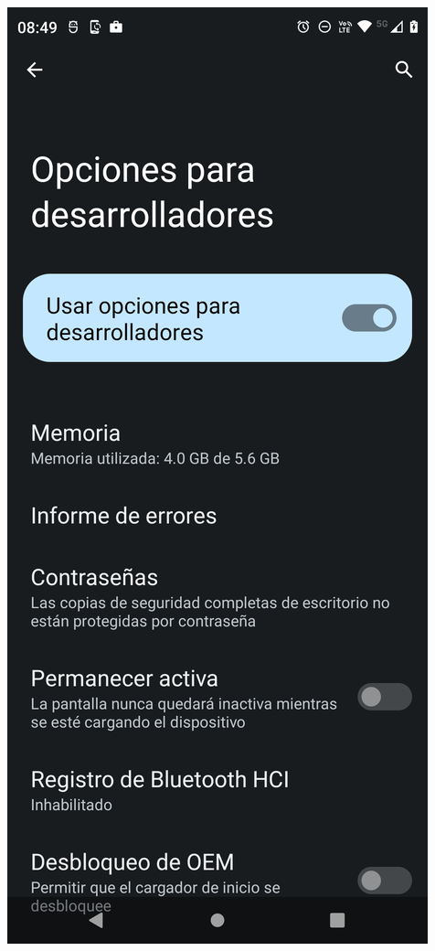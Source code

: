 \begin{frame}
\begin{columns}
\begin{center}
\end{center}
\begin{center}
\includegraphics[width=0.95\linewidth]{00_Configurar/ModoDesarrollador7.png}    

\end{center}
\end{columns}
\end{frame}
